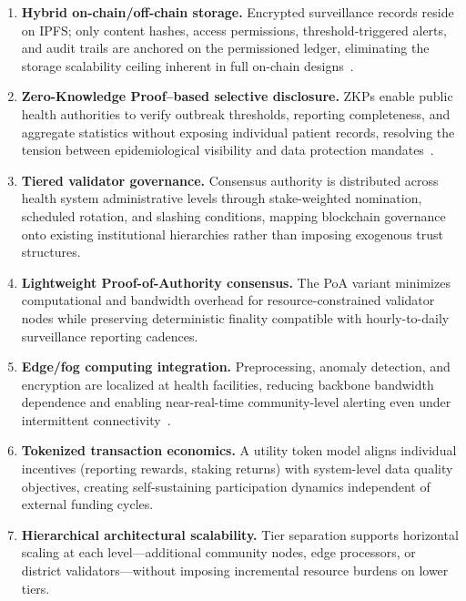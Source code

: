 \documentclass[AMA,LATO1COL]{WileyNJDv5}
\begin{document}
\begin{enumerate}
    \item \textbf{Hybrid on-chain/off-chain storage.} Encrypted surveillance records reside on IPFS; only content hashes, access permissions, threshold-triggered alerts, and audit trails are anchored on the permissioned ledger, eliminating the storage scalability ceiling inherent in full on-chain designs~\cite{Maher2024,Nandanwar2025}.

    \item \textbf{Zero-Knowledge Proof--based selective disclosure.} ZKPs enable public health authorities to verify outbreak thresholds, reporting completeness, and aggregate statistics without exposing individual patient records, resolving the tension between epidemiological visibility and data protection mandates~\cite{Sun2021,Goel2025}.

    \item \textbf{Tiered validator governance.} Consensus authority is distributed across health system administrative levels through stake-weighted nomination, scheduled rotation, and slashing conditions, mapping blockchain governance onto existing institutional hierarchies rather than imposing exogenous trust structures.

    \item \textbf{Lightweight Proof-of-Authority consensus.} The PoA variant minimizes computational and bandwidth overhead for resource-constrained validator nodes while preserving deterministic finality compatible with hourly-to-daily surveillance reporting cadences.

    \item \textbf{Edge/fog computing integration.} Preprocessing, anomaly detection, and encryption are localized at health facilities, reducing backbone bandwidth dependence and enabling near-real-time community-level alerting even under intermittent connectivity~\cite{Akter2025,Saha2025}.

    \item \textbf{Tokenized transaction economics.} A utility token model aligns individual incentives (reporting rewards, staking returns) with system-level data quality objectives, creating self-sustaining participation dynamics independent of external funding cycles.

    \item \textbf{Hierarchical architectural scalability.} Tier separation supports horizontal scaling at each level---additional community nodes, edge processors, or district validators---without imposing incremental resource burdens on lower tiers.
\end{enumerate}
\end{document}
